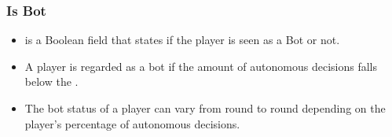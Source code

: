 \documentclass[letterpaper,10pt,english]{sphinxmanual}
\begin{document}
\subsubsection{Is Bot}
\label{\detokenize{Player_fields:is-bot}}\begin{itemize}
\item {} 
 is a Boolean field that states if the player is seen as a Bot or not.

\item {} 
A player is regarded as a bot if the amount of autonomous decisions falls below the {\hyperref[\detokenize{Constants:bot-criteria-ref}]{}}.

\item {} 
The bot status of a player can vary from round to round depending on the player’s percentage of autonomous decisions.

\end{itemize}
\end{document}
